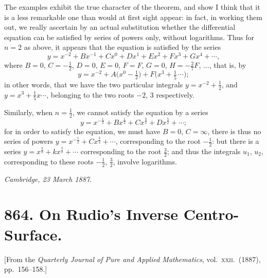 \documentclass[11pt]{article}
\begin{document}
The examples exhibit the true character of the theorem, and show I think that it is a less remarkable one than would at first sight appear: in fact, in working them out, we really ascertain by an actual substitution whether the differential equation can be satisfied by series of powers only, without logarithms. Thus for $n = 2$ as above, it appears that the equation is satisfied by the series
\[
y = x^{-2} + Bx^{-1} + Cx^{0} + Dx^{1} + Ex^{2} + Fx^{3} + Gx^{4} + \cdots,
\]
where $B = 0$, $C = -\tfrac{1}{2}$, $D = 0$, $E = 0$, $F = F$, $G = 0$, $H = -\tfrac{2}{7}F$, $\ldots$, that is, by
\[
y = x^{-2} + A\bigl(x^{0} - \tfrac{1}{2}\bigr) + F\bigl(x^{3} + \tfrac{1}{5}\,\cdots\bigr) ;
\]
in other words, that we have the two particular integrals $y = x^{-2} + \tfrac{1}{2}$, and $y = x^{3} + \tfrac{1}{5}x \cdots$, belonging to the two roots $-2$, $3$ respectively.

Similarly, when $n = \tfrac{1}{2}$, we cannot satisfy the equation by a series
\[
y = x^{-\frac{1}{2}} + Bx^{\frac{1}{2}} + Cx^{\frac{3}{2}} + Dx^{\frac{5}{2}} + \cdots ;
\]
for in order to satisfy the equation, we must have $B = 0$, $C = \infty$, there is thus no series of powers $y = x^{-\frac{1}{2}} + Cx^{\frac{3}{2}} + \cdots$, corresponding to the root $-\tfrac{1}{2}$: but there is a series $y = x^{\frac{3}{2}} + kx^{\frac{5}{2}} + \cdots$ corresponding to the root $\tfrac{3}{2}$; and thus the integrals $u_{1}$, $u_{2}$, corresponding to these roots $-\tfrac{1}{2}$, $\tfrac{3}{2}$, involve logarithms.

\begin{flushright}\textit{Cambridge, 23 March 1887.}\end{flushright}

\vfill
\newpage

\section*{864. On Rudio's Inverse Centro-Surface.}

\begin{flushright}\small
[From the \textit{Quarterly Journal of Pure and Applied Mathematics}, vol.~\textsc{xxii}.\ (1887), pp.~156--158.]
\end{flushright}

\medskip
\end{document}
